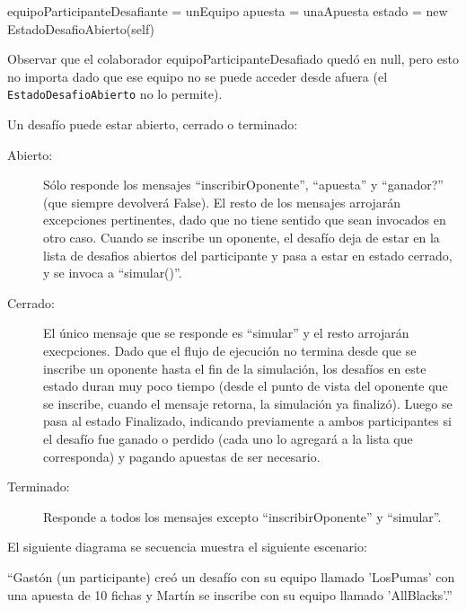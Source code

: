 \begin{algorithmic}
	  \State equipoParticipanteDesafiante = unEquipo
	  \State apuesta = unaApuesta
	  \State estado = new EstadoDesafioAbierto(self)
	\EndFunction
\end{algorithmic}

Observar que el colaborador equipoParticipanteDesafiado quedó en null, pero esto no importa dado que ese equipo no se puede acceder desde
afuera (el {\tt EstadoDesafioAbierto} no lo permite).

Un desafío puede estar abierto, cerrado o terminado:
\begin{description}
 \item[Abierto:] Sólo responde los mensajes ``inscribirOponente'', ``apuesta'' y ``ganador?'' (que siempre devolverá False). El resto de los mensajes
 arrojarán excepciones pertinentes, dado que no tiene sentido que sean invocados en otro caso. Cuando se inscribe un oponente, el desafío deja de estar
 en la lista de desafios abiertos del participante y pasa a estar en estado cerrado, y se invoca a ``simular()''.
 \item[Cerrado:] El único mensaje que se responde es ``simular'' y el resto arrojarán execpciones. Dado que el flujo de ejecución no termina
 desde que se inscribe un oponente hasta el fin de la simulación, los desafíos en este estado duran muy poco tiempo (desde el punto de vista del oponente
 que se inscribe, cuando el mensaje retorna, la simulación ya finalizó). Luego se pasa al estado Finalizado, indicando previamente a ambos participantes
 si el desafío fue ganado o perdido (cada uno lo agregará a la lista que corresponda) y pagando apuestas de ser necesario.
 \item[Terminado:] Responde a todos los mensajes excepto ``inscribirOponente'' y ``simular''.
\end{description}

El siguiente diagrama se secuencia muestra el siguiente escenario:

``Gastón (un participante) creó un desafío con su equipo llamado 'LosPumas' con una apuesta de 10 fichas y Martín se inscribe con su equipo llamado 
'AllBlacks'.''


